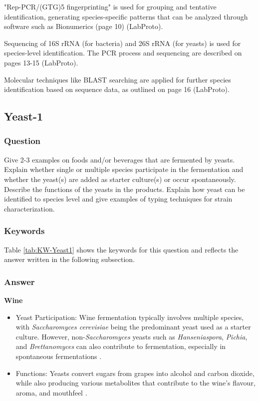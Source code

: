 "Rep-PCR/(GTG)5 fingerprinting" is used for grouping and tentative identification, generating species-specific patterns that can be analyzed through software such as Bionumerics (page 10) (LabProto).

Sequencing of 16S rRNA (for bacteria) and 26S rRNA (for yeasts) is used for species-level identification. The PCR process and sequencing are described on pages 13-15 (LabProto).

Molecular techniques like BLAST searching are applied for further species identification based on sequence data, as outlined on page 16 (LabProto).

\subsection{Yeast-1}
\subsubsection*{Question}
Give 2-3 examples on foods and/or beverages that are fermented by yeasts. Explain whether single or multiple species participate in the fermentation and whether the yeast(s) are added as starter culture(s) or occur spontaneously. Describe the functions of the yeasts in the products. Explain how yeast can be identified to species level and give examples of typing techniques for strain characterization. 

\subsubsection*{Keywords}
Table \ref{tab:KW-Yeast1} shows the keywords for this question and reflects the answer written in the following subsection.

\subsubsection*{Answer}
\textbf{Wine}
\begin{itemize}
    \item Yeast Participation: Wine fermentation typically involves multiple species, with \textit{Saccharomyces cerevisiae} being the predominant yeast used as a starter culture. However, non-\textit{Saccharomyces} yeasts such as \textit{Hanseniaspora}, \textit{Pichia}, and \textit{Brettanomyces} can also contribute to fermentation, especially in spontaneous fermentations \cite*{L9-ISAPP}.
    \item Functions: Yeasts convert sugars from grapes into alcohol and carbon dioxide, while also producing various metabolites that contribute to the wine's flavour, aroma, and mouthfeel \cite*{L6-Yeasts,L9-ISAPP}.
\end{itemize}


